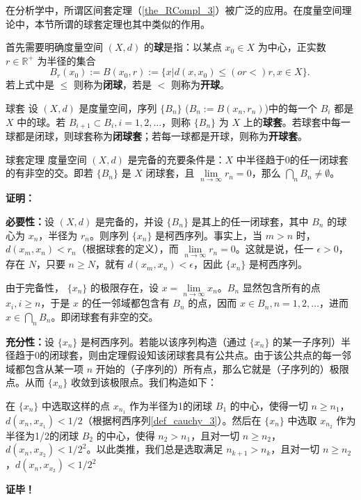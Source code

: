 在分析学中，所谓区间套定理（\autoref{the_RCompl_3}）被广泛的应用。在度量空间理论中，本节所谓的球套定理也其中类似的作用。

首先需要明确度量空间 $(X,d)$ 的\textbf{球}是指：以某点 $x_0\in X$ 为中心，正实数 $r\in\mathbb R^+$ 为半径的集合 
\begin{equation}
B_{r}(x_0):=B(x_0,r):=\{x|d(x,x_0)\leq(or <)r,x\in X\}.~
\end{equation}
若上式中是 $\leq$ 则称为\textbf{闭球}，若是 $<$ 则称为\textbf{开球}。
\begin{definition}{球套}
设 $(X,d)$ 是度量空间，序列 $\{B_n\}$ ($B_n:=B(x_n,r_n)$)中的每一个 $B_i$ 都是 $X$ 中的球。若 $B_{i+1}\subset B_{i},i=1,2,\ldots$，则称 $\{B_n\}$ 为 $X$ 上的\textbf{球套}。若球套中每一球都是闭球，则球套称为\textbf{闭球套}；若每一球都是开球，则称为\textbf{开球套}。
\end{definition}

\begin{theorem}{球套定理}
度量空间 $(X,d)$ 是完备的充要条件是：$X$ 中半径趋于0的任一闭球套的有非空的交。即若 $\{B_n\}$ 是 $X$ 闭球套，且 $\lim\limits_{n\rightarrow\infty}r_n=0$，那么 $\bigcap\limits_n B_n\neq\emptyset$。
\end{theorem}

\textbf{证明：}

\textbf{必要性：}设 $(X,d)$ 是完备的，并设 $\{B_n\}$ 是其上的任一闭球套，其中 $B_n$ 的球心为 $x_n$，半径为 $r_n$。则序列 $\{x_n\}$ 是柯西序列。事实上，当 $m>n$ 时，$d(x_m,x_n)<r_n$（根据球套的定义），而 $\lim\limits_{n\rightarrow\infty}r_n=0$。这就是说，任一 $\epsilon>0$，存在 $N$，只要 $n\geq N$，就有 $d(x_m,x_n)<\epsilon$，因此 $\{x_n\}$ 是柯西序列。

由于完备性， $\{x_n\}$ 的极限存在，设 $x=\lim\limits_{n\rightarrow\infty}x_n$。$B_n$ 显然包含所有的点 $x_i,i\geq n$，于是 $x$ 的任一邻域都包含有 $B_n$ 的点，因而 $x\in B_n,n=1,2,\ldots$，进而
$x\in\bigcap\limits_n B_n$。即闭球套有非空的交。

\textbf{充分性：}设 $\{x_n\}$ 是柯西序列。若能以该序列构造（通过 $\{x_n\}$ 的某一子序列）半径趋于0的闭球套，则由定理假设知该闭球套具有公共点。由于该公共点的每一邻域都包含从某一项 $n$ 开始的（子序列的）所有点，那么它就是（子序列的）极限点。从而 $\{x_n\}$ 收敛到该极限点。我们构造如下：

在 $\{x_n\}$ 中选取这样的点 $x_{n_1}$ 作为半径为1的闭球 $B_1$ 的中心，使得一切 $n\geq n_1$，$d(x_n,x_{x_1})<1/2$（根据柯西序列\autoref{def_cauchy_3}）。然后在 $\{x_n\}$ 中选取 $x_{n_2}$ 作为半径为1/2的闭球 $B_2$ 的中心，使得 $n_2>n_1$，且对一切 $n\geq n_2$，$d(x_n,x_{x_2})<1/2^2$。以此类推，我们总是选取满足 $n_{k+1}>n_k$，且对一切 $n\geq n_2$，$d(x_n,x_{x_2})<1/2^2$

\textbf{证毕！}









